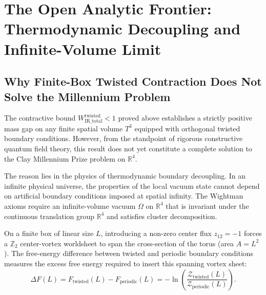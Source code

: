 \documentclass[11pt,a4paper]{article}
\theoremstyle{definition}
\theoremstyle{remark}
\newcommand{\R}{\mathbb{R}}
\begin{document}
\section{The Open Analytic Frontier: Thermodynamic Decoupling and Infinite-Volume Limit}

\subsection{Why Finite-Box Twisted Contraction Does Not Solve the Millennium Problem}
The contractive bound $W_{\mathrm{IR\_total}}^{\mathrm{twisted}} < 1$ proved above establishes a strictly positive mass gap on any finite spatial volume $T^3$ equipped with orthogonal twisted boundary conditions. However, from the standpoint of rigorous constructive quantum field theory, this result does not yet constitute a complete solution to the Clay Millennium Prize problem on $\R^4$.

The reason lies in the physics of thermodynamic boundary decoupling. In an infinite physical universe, the properties of the local vacuum state cannot depend on artificial boundary conditions imposed at spatial infinity. The Wightman axioms require an infinite-volume vacuum $\Omega$ on $\R^4$ that is invariant under the continuous translation group $\R^4$ and satisfies cluster decomposition. 

On a finite box of linear size $L$, introducing a non-zero center flux $z_{12} = -1$ forces a $\mathbb{Z}_2$ center-vortex worldsheet to span the cross-section of the torus (area $A = L^2$). The free-energy difference between twisted and periodic boundary conditions measures the excess free energy required to insert this spanning vortex sheet:
\begin{equation}
\Delta F(L) = F_{\mathrm{twisted}}(L) - F_{\mathrm{periodic}}(L) = -\ln \left( \frac{\mathcal{Z}_{\mathrm{twisted}}(L)}{\mathcal{Z}_{\mathrm{periodic}}(L)} \right).
\end{equation}
\end{document}
